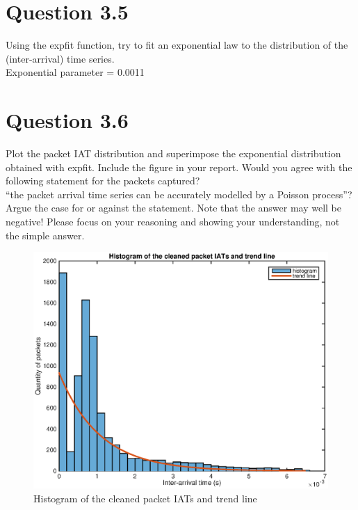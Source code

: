 \documentclass{article}
\newenvironment{homeworkProblem}[1]{
	\section*{#1}
	}{
}
\begin{document}

\begin{homeworkProblem}{Question 3.5}
Using the expfit function, try to fit an exponential law to the distribution of the (inter-arrival) time series.\\

Exponential parameter = 0.0011
\end{homeworkProblem}


\begin{homeworkProblem}{Question 3.6}
Plot the packet IAT distribution and superimpose the exponential distribution obtained with expfit. Include the figure in your report. Would you agree with the following statement for the packets captured?\\
``the packet arrival time series can be accurately modelled by a Poisson process''?\\

Argue the case for or against the statement. Note that the answer may well be negative! Please focus on your reasoning and showing your understanding, not the simple answer.\\

\begin{figure}[H]
\centering
\includegraphics[width=6.6in]{img/histogram1.eps}
\caption{Histogram of the cleaned packet IATs and trend line}
\end{figure}
\end{homeworkProblem}
\end{document}
